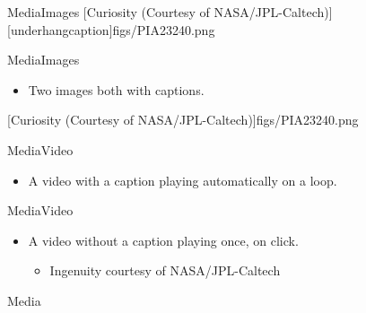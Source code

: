\documentclass[aspectratio=169,12pt]{beamer}%
\begin{document}
    \begin{frame}{Media}{Images}
        {%
            [Curiosity (Courtesy of NASA/JPL-Caltech)][underhangcaption]{figs/PIA23240.png}
        }%
    \end{frame}
    \begin{frame}{Media}{Images}
        \tworowbigbottom%
        {%
            \begin{itemize}
                \item Two images both with captions.
            \end{itemize}
        }%
        {%
            [Curiosity (Courtesy of NASA/JPL-Caltech)]{figs/PIA23240.png}
        }%
    \end{frame}
    \begin{frame}
    \end{frame}


    \begin{frame}{Media}{Video}
        \twocolumnbigright%
        {%
            \begin{itemize}
                \item A video with a caption playing automatically on a loop.
            \end{itemize}
        }%
        {%
        }%
    \end{frame}
    \begin{frame}{Media}{Video}
        \twocolumnbigright%
        {%
            \begin{itemize}
                \item A video without a caption playing once, on click.
                \begin{itemize}
                    \item Ingenuity courtesy of NASA/JPL-Caltech
                \end{itemize}
            \end{itemize}
        }%
        {%
        }%
    \end{frame}
    \begin{frame}{Media}
    \end{frame}
\end{document}
